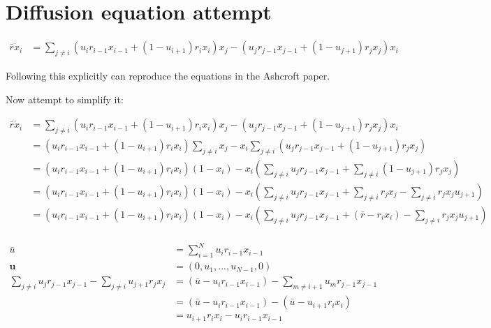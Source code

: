 \documentclass[a4paper]{article}
\begin{document}
\section{Diffusion equation attempt}

\begin{align*}
\bar{r} \dot{x} _i & = \sum _{j \neq i} \left(u_i r_{i-1} x_{i-1} + \left(1 - u_{i+1} \right) r_i x_i \right) x_j - \left(u_j r_{j-1} x_{j-1} + \left(1 - u_{j+1} \right) r_j x_j \right) x_i
\end{align*}

Following this explicitly can reproduce the equations in the Ashcroft paper. 

Now attempt to simplify it: 

\begin{align*}
\bar{r} \dot{x} _i & = \sum _{j \neq i} \left(u_i r_{i-1} x_{i-1} + \left(1 - u_{i+1} \right) r_i x_i \right) x_j - \left(u_j r_{j-1} x_{j-1} + \left(1 - u_{j+1} \right) r_j x_j \right) x_i \\
& = \left(u_i r_{i-1} x_{i-1} + \left(1 - u_{i+1} \right) r_i x_i \right) \sum _{j \neq i} x_j - x_i \sum _{j \neq i} \left(u_j r_{j-1} x_{j-1} + \left(1 - u_{j+1} \right) r_j x_j \right) \\
& = \left(u_i r_{i-1} x_{i-1} + \left(1 - u_{i+1} \right) r_i x_i \right) ( 1- x_i) - x_i \left( \sum _{j \neq i} u _j r_{j-1} x_{j-1} + \sum _{j \neq i} (1 - u_{j+1} ) r_j x_j  \right) \\
& = \left(u_i r_{i-1} x_{i-1} + \left(1 - u_{i+1} \right) r_i x_i \right) ( 1- x_i) - x_i \left( \sum _{j \neq i} u _j r_{j-1} x_{j-1} + \sum _{j \neq i} r_j x_j  - \sum _{j \neq i} r_j x_j u_{j+1}  \right) \\
& = \left(u_i r_{i-1} x_{i-1} + \left(1 - u_{i+1} \right) r_i x_i \right) ( 1- x_i) - x_i \left( \sum _{j \neq i} u _j r_{j-1} x_{j-1} + (\bar{r} - r_i x_i )  - \sum _{j \neq i} r_j x_j u_{j+1}  \right) \\
\end{align*}

\begin{align*}
\bar{u} & = \sum _{i=1} ^{N} u_i r_{i-1} x_{i-1} \\
\mathbf{u} & = (0, u_1, ..., u_{N-1}, 0 ) \\
\sum _{j \neq i} u _j r_{j-1} x_{j-1} - \sum _{j \neq i} u_{j+1}r_j x_j & = ( \bar{u} - u_i r_{i-1} x_{i-1} ) - \sum _{m \neq i +1} u_{m}r_{j-1} x_{j-1} \\
& = ( \bar{u} - u_i r_{i-1} x_{i-1} ) - ( \bar{u} - u_{i+1} r_{i} x_{i}) \\
& = u_{i+1} r_{i} x_{i} - u_i r_{i-1} x_{i-1}
\end{align*}
\end{document}
